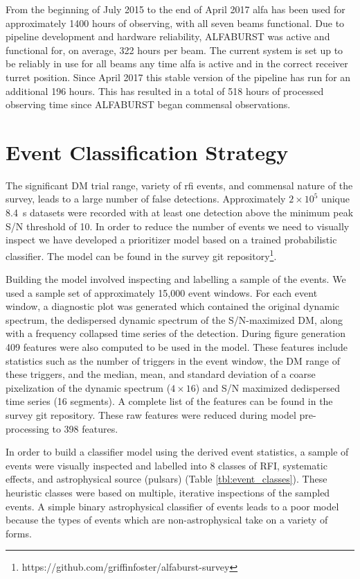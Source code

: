 \documentclass[a4paper,fleqn,usenatbib]{mnras}
\begin{document}
From the beginning of July 2015 to the end of April 2017 \gls{alfa} has been
used for approximately 1400 hours of observing, with all seven beams functional.
Due to pipeline development and hardware reliability, ALFABURST was active and
functional for, on average, 322 hours per beam.  The current system is set up to
be reliably in use for all beams any time \gls{alfa} is active and in the
correct receiver turret position. Since April 2017 this stable version of the
pipeline has run for an additional 196 hours. This has resulted in a total of
518 hours of processed observing time since ALFABURST began commensal observations.



\section{Event Classification Strategy}
\label{sec:event_classify}

The significant DM trial range, variety of \gls{rfi} events, and commensal
nature of the survey, leads to a large number of false detections.
Approximately $2 \times 10^5$ unique 8.4~s datasets were recorded with at least
one detection above the minimum peak S/N threshold of 10. In order to reduce the
number of events we need to visually inspect we have developed a prioritizer
model based on a trained probabilistic classifier. The model can be found in the
survey git
repository\footnote{https://github.com/griffinfoster/alfaburst-survey}.

Building the model involved inspecting and labelling a sample of the events. We
used a sample set of approximately 15,000 event windows.  For each event window,
a diagnostic plot was generated which contained the original dynamic spectrum,
the dedispersed dynamic spectrum of the S/N-maximized DM, along with a frequency
collapsed time series of the detection.  During figure generation 409 features
were also computed to be used in the model.  These features include statistics
such as the number of triggers in the event window, the DM range of these
triggers, and the median, mean, and standard deviation of a coarse pixelization
of the dynamic spectrum ($4 \times 16$) and S/N maximized dedispersed time
series (16 segments). A complete list of the features can be found in the
survey git repository. These raw features were reduced during model
pre-processing to 398 features.

In order to build a classifier model using the derived event statistics, a
sample of events were visually inspected and labelled into 8 classes of RFI,
systematic effects, and astrophysical source (pulsars) (Table
\ref{tbl:event_classes}). These heuristic classes were based on multiple,
iterative inspections of the sampled events. A simple binary astrophysical
classifier of events leads to a poor model because the types of events which
are non-astrophysical take on a variety of forms.
\end{document}
